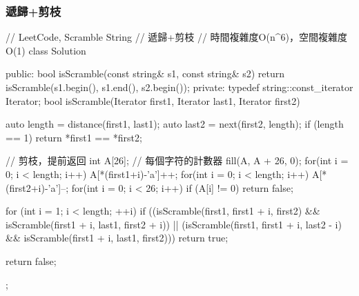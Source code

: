 \subsubsection{遞歸+剪枝}
\begin{Code}
// LeetCode, Scramble String
// 遞歸+剪枝
// 時間複雜度O(n^6)，空間複雜度O(1)
class Solution {
public:
    bool isScramble(const string& s1, const string& s2) {
        return isScramble(s1.begin(), s1.end(), s2.begin());
    }
private:
    typedef string::const_iterator Iterator;
    bool isScramble(Iterator first1, Iterator last1, Iterator first2) {
        auto length = distance(first1, last1);
        auto last2 = next(first2, length);
        if (length == 1) return *first1 == *first2;

        // 剪枝，提前返回
        int A[26]; // 每個字符的計數器
        fill(A, A + 26, 0);
        for(int i = 0; i < length; i++) A[*(first1+i)-'a']++;
        for(int i = 0; i < length; i++) A[*(first2+i)-'a']--;
        for(int i = 0; i < 26; i++) if (A[i] != 0) return false;

        for (int i = 1; i < length; ++i)
            if ((isScramble(first1, first1 + i, first2)
                 && isScramble(first1 + i, last1, first2 + i))
                    || (isScramble(first1, first1 + i, last2 - i)
                            && isScramble(first1 + i, last1, first2)))
                return true;

        return false;
    }
};
\end{Code}



